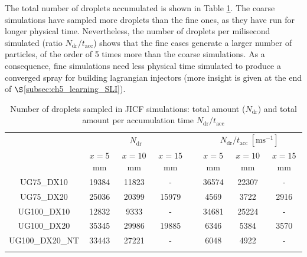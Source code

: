 The total number of droplets accumulated is shown in Table \ref{tab:jicf_SLI_Ndr_accumulated}. The coarse simulations have sampled more droplets than the fine ones, as they have run for longer physical time. Nevertheless, the number of droplets per milisecond simulated (ratio $N_\mathrm{dr}/t_\mathrm{acc}$) shows that the fine cases generate a larger number of particles, of the order of 5 times more than the coarse simulations. As a consequence, fine simulations need less physical time simulated to produce a converged spray for building lagrangian injectors (more insight is given at the end of $\S$\ref{subsec:ch5_learning_SLI}).

\clearpage


\begin{table}[!h]
\centering
\caption{Number of droplets sampled in JICF simulations: total amount ($N_\mathrm{dr}$) and total amount per accumulation time $N_\mathrm{dr}/t_\mathrm{acc}$}
\begin{tabular}{cccccccc}
\thickhline
\multirow{2}{*}{ \textbf{Case}}  & \multicolumn{3}{c}{$N_\mathrm{dr}$} & & \multicolumn{3}{c}{$N_\mathrm{dr}/t_\mathrm{acc}~[\mathrm{ms}^{-1}]$} \\
\cline{2-4} \cline{6-8}
& $x = 5$ mm & $x = 10$ mm & $x = 15$ mm &  & $x = 5$ mm & $x = 10$ mm & $x = 15$ mm  \\
\thickhline 
UG75\_DX10  & 19384 & 11823 & -  & & 36574 & 22307 & - \\
UG75\_DX20  & 25036 & 20399 & 15979  & & 4569 & 3722 & 2916 \\
UG100\_DX10 & 12832 & 9333 & -  & & 34681 & 25224 & - \\
UG100\_DX20 & 35345 & 29986 & 19885  & & 6346 & 5384 & 3570 \\
UG100\_DX20\_NT & 33443 & 27221 & -  & & 6048 & 4922 & - \\
\thickhline
\end{tabular}
\label{tab:jicf_SLI_Ndr_accumulated}
\end{table}








